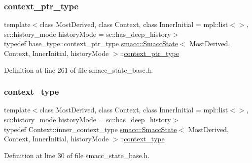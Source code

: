 \subsubsection{\texorpdfstring{context\+\_\+ptr\+\_\+type}{context\_ptr\_type}}
{\footnotesize\ttfamily template$<$class Most\+Derived, class Context, class Inner\+Initial = mpl\+::list$<$$>$, sc\+::history\+\_\+mode history\+Mode = sc\+::has\+\_\+deep\+\_\+history$>$ \\
typedef base\+\_\+type\+::context\+\_\+ptr\+\_\+type \hyperlink{classsmacc_1_1SmaccState}{smacc\+::\+Smacc\+State}$<$ Most\+Derived, Context, Inner\+Initial, history\+Mode $>$\+::\hyperlink{classsmacc_1_1SmaccState_a0e15b77514301039f6bc093a9d3f6425}{context\+\_\+ptr\+\_\+type}}



Definition at line 261 of file smacc\+\_\+state\+\_\+base.\+h.

\mbox{\label{classsmacc_1_1SmaccState_a65c128d05dbcadbf817f41ba20b8fa01}} 
\subsubsection{\texorpdfstring{context\+\_\+type}{context\_type}}
{\footnotesize\ttfamily template$<$class Most\+Derived, class Context, class Inner\+Initial = mpl\+::list$<$$>$, sc\+::history\+\_\+mode history\+Mode = sc\+::has\+\_\+deep\+\_\+history$>$ \\
typedef Context\+::inner\+\_\+context\+\_\+type \hyperlink{classsmacc_1_1SmaccState}{smacc\+::\+Smacc\+State}$<$ Most\+Derived, Context, Inner\+Initial, history\+Mode $>$\+::\hyperlink{classsmacc_1_1SmaccState_a65c128d05dbcadbf817f41ba20b8fa01}{context\+\_\+type}}



Definition at line 30 of file smacc\+\_\+state\+\_\+base.\+h.

\mbox{\label{classsmacc_1_1SmaccState_a65a772c2e2039e9a59148ba6ffb54d8a}} 
